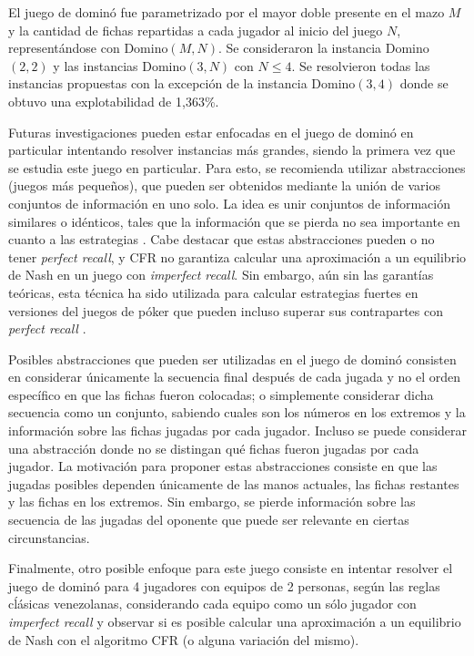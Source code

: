 El juego de dominó fue parametrizado por el mayor doble presente en el mazo $M$ y la cantidad de fichas repartidas a cada jugador al inicio del juego $N$, representándose con Domino$(M, N)$. Se consideraron la instancia Domino$(2, 2)$ y las instancias Domino$(3, N)$ con $N \leq 4$. Se resolvieron todas las instancias propuestas con la excepción de la instancia Domino$(3, 4)$ donde se obtuvo una explotabilidad de 1,363\%.


Futuras investigaciones pueden estar enfocadas en el juego de dominó en particular intentando resolver instancias más grandes, siendo la primera vez que se estudia este juego en particular. Para esto, se recomienda utilizar abstracciones (juegos más pequeños), que pueden ser obtenidos mediante la unión de varios conjuntos de información en uno solo. La idea es unir conjuntos de información similares o idénticos, tales que la información que se pierda no sea importante en cuanto a las estrategias \cite[pp.~71-72]{bib:thesis-marc-lanctot}. Cabe destacar que estas abstracciones pueden o no tener \textit{perfect recall}, y CFR no garantiza calcular una aproximación a un equilibrio de Nash en un juego con \textit{imperfect recall}. Sin embargo, aún sin las garantías teóricas, esta técnica ha sido utilizada para calcular estrategias fuertes en versiones del juegos de póker que pueden incluso superar sus contrapartes con \textit{perfect recall} \cite{bib:imperfect-recall}.

Posibles abstracciones que pueden ser utilizadas en el juego de dominó consisten en considerar únicamente la secuencia final después de cada jugada y no el orden específico en que las fichas fueron colocadas; o simplemente considerar dicha secuencia como un conjunto, sabiendo cuales son los números en los extremos y la información sobre las fichas jugadas por cada jugador. Incluso se puede considerar una abstracción donde no se distingan qué fichas fueron jugadas por cada jugador. La motivación para proponer estas abstracciones consiste en que las jugadas posibles dependen únicamente de las manos actuales, las fichas restantes y las fichas en los extremos. Sin embargo, se pierde información sobre las secuencia de las jugadas del oponente que puede ser relevante en ciertas circunstancias.

Finalmente, otro posible enfoque para este juego consiste en intentar resolver el juego de dominó para 4 jugadores con equipos de 2 personas, según las reglas cĺásicas venezolanas, considerando cada equipo como un sólo jugador con \textit{imperfect recall} y observar si es posible calcular una aproximación a un equilibrio de Nash con el algoritmo CFR (o alguna variación del mismo).
